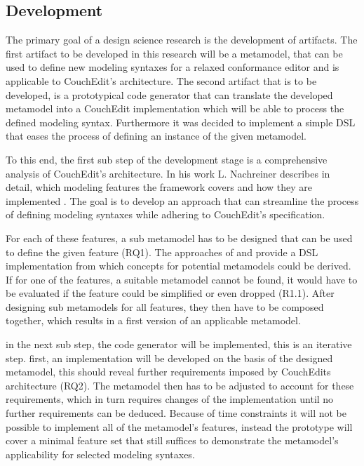 \subsection{Development}
The primary goal of a design science research is the development of artifacts.
The first artifact to be developed in this research will be a metamodel, that can be used to define new modeling syntaxes for a relaxed conformance editor and is applicable to CouchEdit's architecture. The second artifact that is to be developed, is a prototypical code generator that can translate the developed metamodel into a CouchEdit implementation which will be able to process the defined modeling syntax. Furthermore it was decided to implement a simple DSL that eases the process of defining an instance of the given metamodel.

To this end, the first sub step of the development stage is a comprehensive analysis of CouchEdit's architecture. In his work L. Nachreiner describes in detail, which modeling features the framework covers and how they are implemented \cite{nachreiner_couchedit_2020}. The goal is to develop an approach that can streamline the process of defining modeling syntaxes while adhering to CouchEdit's specification. 


For each of these features, a sub metamodel has to be designed that can be used to define the given feature (RQ1). The approaches of \cite{minas_specifying_2001} and \cite{fondement_making_2005} provide a DSL implementation from which concepts for potential metamodels could be derived. If for one of the features, a suitable metamodel cannot be found, it would have to be evaluated if the feature could be simplified or even dropped (R1.1). After designing sub metamodels for all features, they then have to be composed together, which results in a first version of an applicable metamodel. 

in the next sub step, the code generator will be implemented, this is an iterative step. first, an implementation will be developed on the basis of the designed metamodel, this should reveal further requirements imposed by CouchEdits architecture (RQ2). The metamodel then has to be adjusted to account for these requirements, which in turn requires changes of the implementation until no further requirements can be deduced. Because of time constraints it will not be possible to implement all of the metamodel's features, instead the prototype will cover a minimal feature set that still suffices to demonstrate the metamodel's applicability for selected modeling syntaxes.

